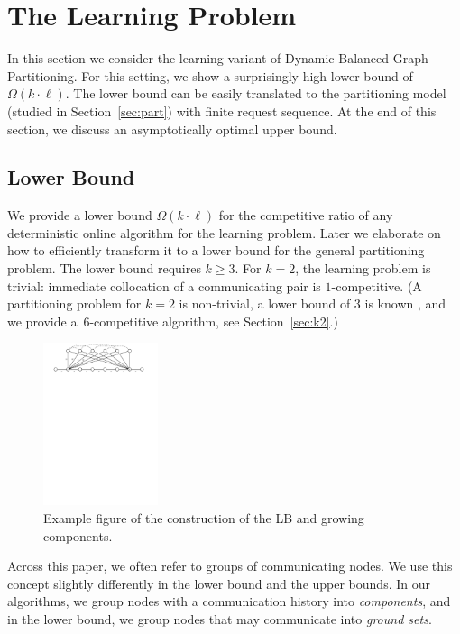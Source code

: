 \documentclass[a4paper,anonymous,USenglish]{lipics-v2019}
\begin{document}
\section{The Learning Problem} %

In this section we consider the learning variant of Dynamic Balanced Graph Partitioning.
For this setting, we show a surprisingly high lower bound of $\Omega(k \cdot \ell)$.
The lower bound can be easily translated to the partitioning model (studied in Section~\ref{sec:part}) with finite request sequence.
At the end of this section, we discuss an asymptotically optimal upper bound.


\subsection{Lower Bound}

\label{sec:lowerbound}


We provide a lower bound $\Omega(k\cdot \ell)$ for the competitive ratio of any deterministic online algorithm for the learning problem.
Later we elaborate on how to efficiently transform it to a lower bound for the general partitioning problem.
The lower bound requires $k\geq 3$.
For $k=2$, the learning problem is trivial: immediate collocation of a communicating pair is $1$-competitive.
(A partitioning problem for $k=2$ is non-trivial, a lower bound of $3$ is known \cite{repartition-disc}, and we provide a~$6$-competitive algorithm, see Section~\ref{sec:k2}.)




\begin{figure}[H]
	\centering
	\includegraphics[width=0.3\textwidth]{figs/substitute}
	\caption{Example figure of the construction of the LB and growing components.}
	\label{fig:nptree-construction}
\end{figure}


Across this paper, we often refer to groups of communicating nodes.
We use this concept slightly differently in the lower bound and the upper bounds.
In our algorithms, we group nodes with a communication history into \emph{components}, and in the lower bound, we group nodes that may communicate into \emph{ground sets}.
\end{document}
